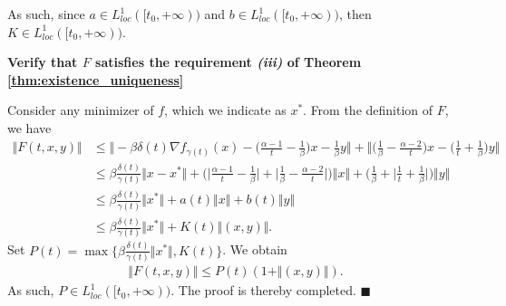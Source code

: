 \documentclass[11pt]{article}
\numberwithin{equation}{section}
\newenvironment{proof}{\bigskip\noindent{\bf Proof.}}{\hfill $\blacksquare$ \par\bigskip\noindent}
\begin{document}
\begin{proof}
As such, since $a \in L^1_{loc}([t_0,+\infty))$ and $b \in L^1_{loc}([t_0,+\infty))$, then $K \in L^1_{loc}([t_0,+\infty))$. 

\textbf{Verify that $F$ satisfies the requirement \textit{(iii)} of Theorem \ref{thm:existence_uniqueness}} 

Consider any minimizer of $f$, which we indicate as $x^*$. From the definition of $F$, we have 
\begin{align*}
    \Vert F(t,x,y) \Vert &\le \Big\Vert -\beta\delta(t)\nabla f_{\gamma(t)}(x)-\Big(\frac{\alpha-1}{t}-\frac{1}{\beta}\Big)x-\frac{1}{\beta}y \Big\Vert 
    +\Big\Vert\Big(\frac{1}{\beta}-\frac{\alpha-2}{t}\Big)x-\Big(\frac{1}{t}+\frac{1}{\beta}\Big)y \Big\Vert \\
    &\le \beta\frac{\delta(t)}{\gamma(t)}\Vert x-x^* \Vert+\Big(\Big\vert\frac{\alpha-1}{t}-\frac{1}{\beta}\Big\vert+\Big\vert\frac{1}{\beta}-\frac{\alpha-2}{t}\Big\vert\Big)\Vert x \Vert +\Big(\frac{1}{\beta}+\Big\vert\frac{1}{t}+\frac{1}{\beta}\Big\vert\Big)\Vert y \Vert \\
    &\le \beta\frac{\delta(t)}{\gamma(t)}\Vert x^*\Vert +a(t) \Vert x \Vert + b(t)\Vert y \Vert \\
    &\le \beta\frac{\delta(t)}{\gamma(t)}\Vert x^*\Vert +K(t) \Vert (x,y) \Vert.
\end{align*}
Set $P(t)=\max\big\{\beta\frac{\delta(t)}{\gamma(t)}\Vert x^*\Vert,K(t)\big\}$. We obtain 
\begin{align*}
   \Vert F(t,x,y) \Vert \le P(t)(1+\Vert (x,y)\Vert). 
\end{align*}
As such, $P \in L^1_{loc}([t_0,+\infty))$. The proof is thereby completed.  
\end{proof}
\end{document}
